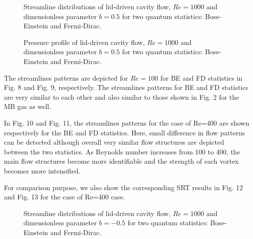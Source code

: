 \documentclass[doublecol]{epl2}
\begin{document}
\begin{figure}[ht]
	\centering
	\vfill
	\caption[A set of four subfigures.]{Streamline distributions of lid-driven cavity flow, $Re=1000$ and dimensionless parameter $b=0.5$ for two  quantum statistics:
	 Bose-Einstein and
	 Fermi-Dirac.}
	\label{fig:Streamlines_bp05}
\end{figure}


\begin{figure}[ht]
	\centering
	\vfill
	\caption[A set of four subfigures.]{Pressure profile of lid-driven cavity flow, $Re=1000$ and dimensionless parameter $b=0.5$ for two quantum statistics:
	 Bose-Einstein and
	 Fermi-Dirac.}
	\label{fig:pressure_profile_bp05}
\end{figure}


The streamlines patterns are depicted for $Re=100$ for BE and FD  statistics in Fig. 8 and Fig. 9, respectively. The streamlines patterns for BE and FD statistics are very similar to each other and also similar to those shown in Fig. 2 for the MB gas as well.

In Fig. 10 and Fig. 11, the streamlines patterns for the case of Re=400 are shown respectively for the BE and FD statistics. Here, small difference in flow patterns can be detected although overall very similar flow structures are depicted between the two statistics. As Reynolds number increases from 100 to 400, the main flow structures become more identifiable and the strength of each vortex becomes more intensified.

For comparison purpose, we also show the corresponding SRT results in Fig. 12 and Fig. 13 for the case of Re=400 case.

\begin{figure}[ht]
	\centering
	\vfill
	\caption[A set of four subfigures.]{Streamline distributions of lid-driven cavity flow, $Re=1000$ and dimensionless parameter $b=-0.5$ for two  quantum statistics:
	 Bose-Einstein and
	 Fermi-Dirac.}
	\label{fig:Streamlines_bn05}
\end{figure}
\end{document}
